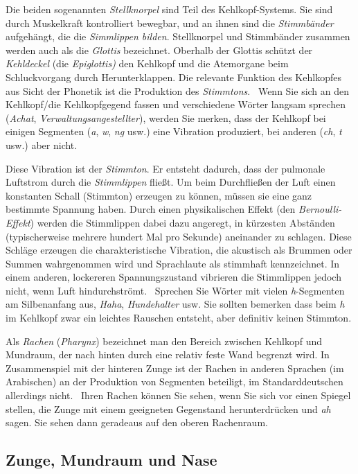 Die beiden sogenannten \textit{Stellknorpel} sind Teil des Kehlkopf-Systems.
Sie sind durch Muskelkraft kontrolliert bewegbar, und an ihnen sind die \textit{Stimmbänder} aufgehängt, die die \textit{Simmlippen bilden}.
Stellknorpel und Stimmbänder zusammen werden auch als die \textit{Glottis} bezeichnet.
Oberhalb der Glottis schützt der \textit{Kehldeckel} (die \textit{Epiglottis)} den Kehlkopf und die Atemorgane beim Schluckvorgang durch Herunterklappen.
Die relevante Funktion des Kehlkopfes aus Sicht der Phonetik ist die Produktion des \textit{Stimmtons}.
\TuBegin~Wenn Sie sich an den Kehlkopf/die Kehlkopfgegend fassen und verschiedene Wörter langsam sprechen (\zB \textit{Achat}, \textit{Verwaltungsangestellter}), werden Sie merken, dass der Kehlkopf bei einigen Segmenten (\textit{a}, \textit{w}, \textit{ng} usw.) eine Vibration produziert, bei anderen (\textit{ch}, \textit{t} usw.) aber nicht.

Diese Vibration ist der \textit{Stimmton}.
Er entsteht dadurch, dass der pulmonale Luftstrom durch die \textit{Stimmlippen} fließt.
Um beim Durchfließen der Luft einen konstanten Schall (Stimmton) erzeugen zu können, müssen sie eine ganz bestimmte Spannung haben.
Durch einen physikalischen Effekt (den \textit{Bernoulli-Effekt}) werden die Stimmlippen dabei dazu angeregt, in kürzesten Abständen (typischerweise mehrere hundert Mal pro Sekunde) aneinander zu schlagen.
Diese Schläge erzeugen die charakteristische Vibration, die akustisch als Brummen oder Summen wahrgenommen wird und Sprachlaute als stimmhaft kennzeichnet.
In einem anderen, lockereren Spannungszustand vibrieren die Stimmlippen jedoch nicht, wenn Luft hindurchströmt.
\TuBegin~Sprechen Sie Wörter mit vielen \textit{h}-Segmenten am Silbenanfang aus, \zB \textit{Haha}, \textit{Hundehalter} usw.
Sie sollten bemerken dass beim \textit{h} im Kehlkopf zwar ein leichtes Rauschen entsteht, aber definitiv keinen Stimmton.

Als \textit{Rachen} (\textit{Pharynx}) bezeichnet man den Bereich zwischen Kehlkopf und Mundraum, der nach hinten durch eine relativ feste Wand begrenzt wird.
In Zusammenspiel mit der hinteren Zunge ist der Rachen in anderen Sprachen (\zB im Arabischen) an der Produktion von Segmenten beteiligt, im Standarddeutschen allerdings nicht.
\TuBegin~Ihren Rachen können Sie sehen, wenn Sie sich vor einen Spiegel stellen, die Zunge mit einem geeigneten Gegenstand herunterdrücken und \textit{ah} sagen.
Sie sehen dann geradeaus auf den oberen Rachenraum.

\subsection{Zunge, Mundraum und Nase}

